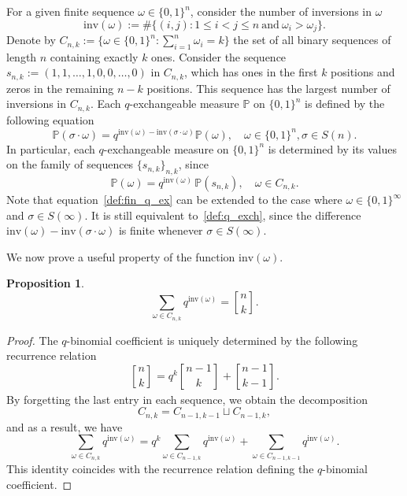 \documentclass[12pt, a4paper]{amsart}
\numberwithin{equation}{subsection}
\newtheorem{prop}[equation]{Proposition}
\theoremstyle{definition}
\newcommand{\qbinom}[3]{\genfrac{[}{]}{0pt}{}{#1}{#2}_{#3}}
\newcommand{\bP}{{\mathbb P}}
\begin{document}
For a given finite sequence $\omega \in \{0,1\}^{n}$, consider the number of inversions in $\omega$
\begin{equation*}
    \mathrm{inv}(\omega) := \#\{(i, j) : 1 \leq i < j \leq n \ \text{and} \ \omega_{i} > \omega_{j}\}.
\end{equation*}
Denote by $C_{n,k} := \{\omega \in \{0,1\}^{n} : \sum_{i=1}^{n} \omega_{i} = k\}$ the set of all binary sequences of length $n$ containing exactly $k$ ones. Consider the sequence $s_{n,k} := (1,1,\ldots,1,0,0,\ldots,0)$ in $C_{n,k}$, which has ones in the first $k$ positions and zeros in the remaining $n-k$ positions. This sequence has the largest number of inversions in $C_{n,k}$. Each $q$-exchangeable measure $\mathbb{P}$ on $\{0,1\}^{n}$ is defined by the following equation
\begin{equation}\label{def:fin_q_ex}
\bP(\sigma \cdot \omega) = q^{\text{inv}(\omega) - \text{inv}(\sigma \cdot \omega)} \bP(\omega), \quad \omega \in \{0,1\}^{n}, \sigma \in S(n).
\end{equation}
In particular, each $q$-exchangeable measure on $\{0,1\}^{n}$ is determined by its values on the family of sequences $\{s_{n,k}\}_{n,k}$, since
\begin{equation}
\mathbb{P}(\omega) = q^{\mathrm{inv}(\omega)} \, \mathbb{P}(s_{n,k}), \quad \omega \in C_{n,k}.
\end{equation}
Note that equation~\eqref{def:fin_q_ex} can be extended to the case where $\omega \in \{0,1\}^{\infty}$ and $\sigma \in S(\infty)$. It is still equivalent to~\eqref{def:q_exch}, since the difference $\mathrm{inv}(\omega) - \mathrm{inv}(\sigma \cdot \omega)$ is finite whenever $\sigma \in S(\infty)$.

We now prove a useful property of the  function $\text{inv}(\omega)$.
\begin{prop}
\begin{equation}\label{inv_comput}
\sum_{\omega\in C_{n,k}} q^{\text{inv}(\omega)} = \qbinom{n}{k}{}.    
\end{equation}
\end{prop}
\begin{proof}
The $q$-binomial coefficient is uniquely determined by the following recurrence relation
\begin{equation*}
\qbinom{n}{k}{} = q^{k} \qbinom{n-1}{k}{} + \qbinom{n-1}{k-1}{}.
\end{equation*}
By forgetting the last entry in each sequence, we obtain the decomposition
\[
C_{n,k} = C_{n-1,k-1} \sqcup C_{n-1,k},
\]
and as a result, we have
\begin{equation*}
\sum_{\omega\in C_{n,k}} q^{\mathrm{inv}(\omega)} = q^{k}\sum_{\omega\in C_{n-1,k}} q^{\mathrm{inv}(\omega)} +  \sum_{\omega\in C_{n-1,k-1}} q^{\mathrm{inv}(\omega)}.
\end{equation*}
This identity coincides with the recurrence relation defining the $q$-binomial coefficient.

\end{proof}
\end{document}
